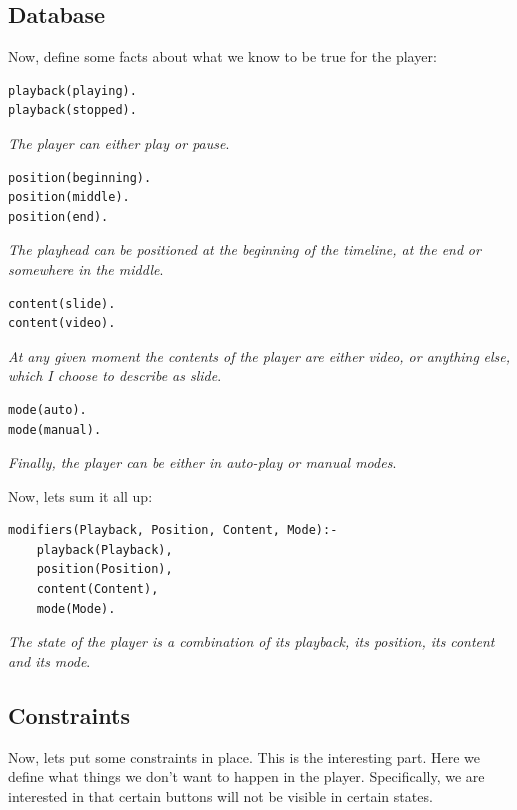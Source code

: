 \documentclass[11pt]{article}
\begin{document}
\subsection{Database}
\label{sec-2-1}

Now, define some facts about what we know to be true for the player:

\begin{verbatim}
playback(playing).
playback(stopped).
\end{verbatim}

\emph{The player can either play or pause}.

\begin{verbatim}
position(beginning).
position(middle).
position(end).
\end{verbatim}

\emph{The playhead can be positioned at the beginning of the timeline, at the end}
\emph{or somewhere in the middle}.

\begin{verbatim}
content(slide).
content(video).
\end{verbatim}

\emph{At any given moment the contents of the player are either video, or anything}
\emph{else, which I choose to describe as slide}.

\begin{verbatim}
mode(auto).
mode(manual).
\end{verbatim}

\emph{Finally, the player can be either in auto-play or manual modes}.

Now, lets sum it all up:

\begin{verbatim}
modifiers(Playback, Position, Content, Mode):-
    playback(Playback),
    position(Position),
    content(Content),
    mode(Mode).
\end{verbatim}

\emph{The state of the player is a combination of its playback, its position, its}
\emph{content and its mode}.
\subsection{Constraints}
\label{sec-2-2}

Now, lets put some constraints in place.  This is the interesting part.  Here we
define what things we don't want to happen in the player.  Specifically, we are
interested in that certain buttons will not be visible in certain states.
\end{document}
